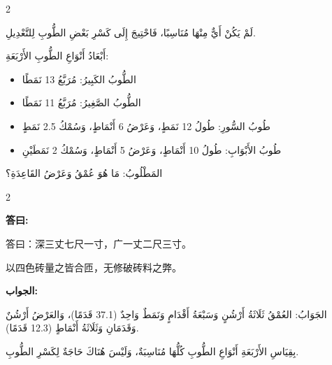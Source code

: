 \documentclass[11pt,a4paper]{article}
\newcommand{\ar}[1]{\arabicfont\beginR #1\endR}
\newenvironment{bilingual}{%
  \begin{paracol}{2}
}{%
  \end{paracol}
}
\newcommand{\cnlabel}[1]{\textcolor{algocolor}{\textbf{#1}}}
\newcommand{\arlabel}[1]{\ar{\textcolor{algocolor}{\textbf{#1}}}}
\begin{document}
\begin{bilingual}
\begin{rightcolumn*}
\ar{لَمْ يَكُنْ أَيٌّ مِنْهَا مُنَاسِبًا، فَاحْتِيجَ إِلَى كَسْرِ بَعْضِ الطُّوبِ لِلتَّعْدِيلِ.}

\ar{أَبْعَادُ أَنْوَاعِ الطُّوبِ الأَرْبَعَةِ:}
\begin{itemize}
  \item \ar{الطُّوبُ الكَبِيرُ: مُرَبَّعُ 13 نَمَطًا}
  \item \ar{الطُّوبُ الصَّغِيرُ: مُرَبَّعُ 11 نَمَطًا}
  \item \ar{طُوبُ السُّورِ: طُولُ 12 نَمَطٍ، وَعَرْضُ 6 أَنْمَاطٍ، وَسُمْكُ 2.5 نَمَطٍ}
  \item \ar{طُوبُ الأَبْوَابِ: طُولُ 10 أَنْمَاطٍ، وَعَرْضُ 5 أَنْمَاطٍ، وَسُمْكُ 2 نَمَطَيْنِ}
\end{itemize}

\ar{المَطْلُوبُ: مَا هُوَ عُمْقُ وَعَرْضُ القَاعِدَةِ؟}
\end{rightcolumn*}

\end{bilingual}

\vspace{1em}

\begin{bilingual}

\begin{leftcolumn*}
\cnlabel{答曰:}

答曰：深三丈七尺一寸，广一丈二尺三寸。

以四色砖量之皆合匝，无修破砖料之弊。
\end{leftcolumn*}

\begin{rightcolumn*}
\arlabel{الجواب:}

\ar{الجَوَابُ: العُمْقُ ثَلَاثَةُ أَرْشُنٍ وَسَبْعَةُ أَقْدَامٍ وَنَمَطٌ وَاحِدٌ (37.1 قَدَمًا)، وَالعَرْضُ أَرْشُنٌ وَقَدَمَانِ وَثَلَاثَةُ أَنْمَاطٍ (12.3 قَدَمًا).}

\ar{بِقِيَاسِ الأَرْبَعَةِ أَنْوَاعِ الطُّوبِ كُلُّهَا مُنَاسِبَةٌ، وَلَيْسَ هُنَاكَ حَاجَةٌ لِكَسْرِ الطُّوبِ.}
\end{rightcolumn*}

\end{bilingual}

\vspace{1em}
\end{document}
